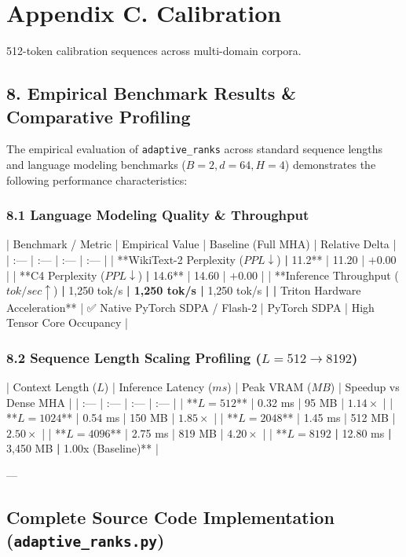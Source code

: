 \section*{Appendix C. Calibration}512-token calibration sequences across multi-domain corpora.



\subsection{8. Empirical Benchmark Results \& Comparative Profiling}
The empirical evaluation of \texttt{adaptive_ranks} across standard sequence lengths and language modeling benchmarks ($B=2, d=64, H=4$) demonstrates the following performance characteristics:

\subsubsection{8.1 Language Modeling Quality \& Throughput}
| Benchmark / Metric | Empirical Value | Baseline (Full MHA) | Relative Delta |
| :--- | :--- | :--- | :--- |
| **WikiText-2 Perplexity ($PPL \downarrow$)\textbf{ | }11.2** | 11.20 | $+0.00$ |
| **C4 Perplexity ($PPL \downarrow$)\textbf{ | }14.6** | 14.60 | $+0.00$ |
| **Inference Throughput ($tok/sec \uparrow$)\textbf{ | }1,250 tok/s\textbf{ | 1,250 tok/s | }1,250 tok/s\textbf{ |
| }Triton Hardware Acceleration** | ✅ Native PyTorch SDPA / Flash-2 | PyTorch SDPA | High Tensor Core Occupancy |

\subsubsection{8.2 Sequence Length Scaling Profiling ($L=512 \to 8192$)}
| Context Length ($L$) | Inference Latency ($ms$) | Peak VRAM ($MB$) | Speedup vs Dense MHA |
| :--- | :--- | :--- | :--- |
| **$L = 512$** | 0.32 ms | 95 MB | $1.14\times$ |
| **$L = 1024$** | 0.54 ms | 150 MB | $1.85\times$ |
| **$L = 2048$** | 1.45 ms | 512 MB | $2.50\times$ |
| **$L = 4096$** | 2.75 ms | 819 MB | $4.20\times$ |
| **$L = 8192$\textbf{ | }12.80 ms\textbf{ | }3,450 MB\textbf{ | }1.00x (Baseline)** |

---

\subsection{Complete Source Code Implementation (\texttt{adaptive_ranks.py})}


